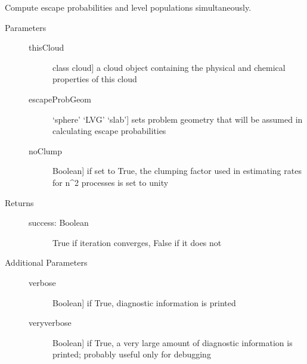 \documentclass[letterpaper,10pt,english]{sphinxmanual}
\begin{document}
\begin{fulllineitems}
\begin{fulllineitems}
\begin{description}
\begin{description}
\end{description}

\end{description}

\end{fulllineitems}


\begin{fulllineitems}
\label{fulldoc:despotic.emitter.setLevPopEscapeProb}
Compute escape probabilities and level populations
simultaneously.
\begin{description}
\item[{Parameters}] \leavevmode\begin{description}
\item[{thisCloud}] \leavevmode{[}class cloud{]}
a cloud object containing the physical and chemical
properties of this cloud

\item[{escapeProbGeom}] \leavevmode{[}`sphere' \textbar{} `LVG' \textbar{} `slab'{]}
sets problem geometry that will be assumed in calculating
escape probabilities

\item[{noClump}] \leavevmode{[}Boolean{]}
if set to True, the clumping factor used in estimating
rates for n\textasciicircum{}2 processes is set to unity

\end{description}

\item[{Returns}] \leavevmode\begin{description}
\item[{success: Boolean}] \leavevmode
True if iteration converges, False if it does not

\end{description}

\item[{Additional Parameters}] \leavevmode\begin{description}
\item[{verbose}] \leavevmode{[}Boolean{]}
if True, diagnostic information is printed

\item[{veryverbose}] \leavevmode{[}Boolean{]}
if True, a very large amount of diagnostic information is
printed; probably useful only for debugging


\end{description}
\end{description}
\end{fulllineitems}
\end{fulllineitems}
\end{document}
